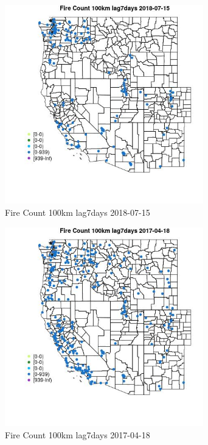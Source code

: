 \begin{figure} 
\centering  
\includegraphics[width=0.77\textwidth]{Code_Outputs/Report_ML_input_PM25_Step4_part_e_de_duplicated_aves_compiled_2019-05-20wNAs_MapObsFire_Count_100km_lag7days2018-07-15.jpg} 
\caption{\label{fig:Report_ML_input_PM25_Step4_part_e_de_duplicated_aves_compiled_2019-05-20wNAsMapObsFire_Count_100km_lag7days2018-07-15}Fire Count 100km lag7days 2018-07-15} 
\end{figure} 
 

\begin{figure} 
\centering  
\includegraphics[width=0.77\textwidth]{Code_Outputs/Report_ML_input_PM25_Step4_part_e_de_duplicated_aves_compiled_2019-05-20wNAs_MapObsFire_Count_100km_lag7days2017-04-18.jpg} 
\caption{\label{fig:Report_ML_input_PM25_Step4_part_e_de_duplicated_aves_compiled_2019-05-20wNAsMapObsFire_Count_100km_lag7days2017-04-18}Fire Count 100km lag7days 2017-04-18} 
\end{figure} 
 

